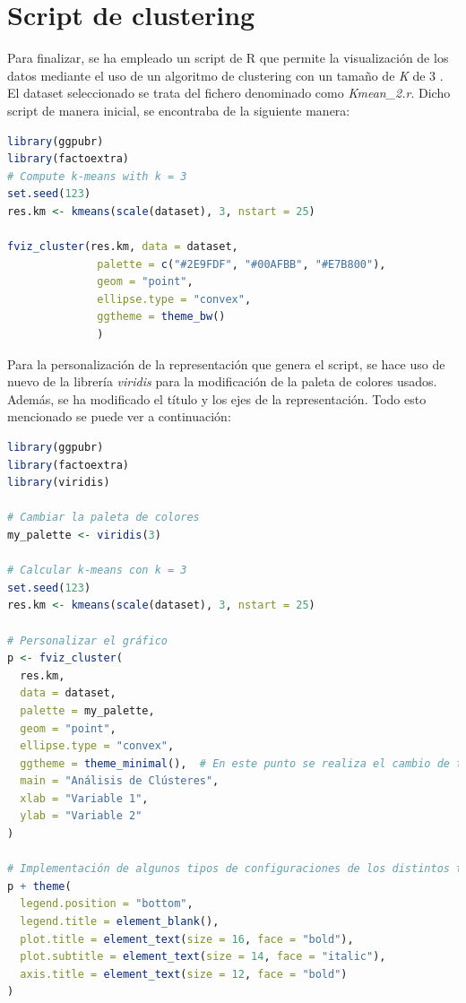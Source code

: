 \documentclass[11pt]{report}
\begin{document}
\section{Script de clustering}

Para finalizar, se ha empleado un script de R que permite la visualización de los datos mediante el uso de un algoritmo de clustering con un tamaño de \emph{K }de 3 . El dataset seleccionado se trata del fichero denominado como \emph{Kmean\_2.r}. Dicho script de manera inicial, se encontraba de la siguiente manera:

\begin{lstlisting}[language=R, breaklines=true, basicstyle=\small\ttfamily]
library(ggpubr)
library(factoextra)
# Compute k-means with k = 3
set.seed(123)
res.km <- kmeans(scale(dataset), 3, nstart = 25)

fviz_cluster(res.km, data = dataset,
              palette = c("#2E9FDF", "#00AFBB", "#E7B800"), 
              geom = "point",
              ellipse.type = "convex", 
              ggtheme = theme_bw()
              )
\end{lstlisting}

Para la personalización de la representación que genera el script, se hace uso de nuevo de la librería \emph{viridis} para la modificación de la paleta de colores usados. Además, se ha modificado el título y los ejes de la representación. Todo esto mencionado se puede ver a continuación:

\begin{lstlisting}[language=R, breaklines=true, basicstyle=\small\ttfamily]
library(ggpubr)
library(factoextra)
library(viridis)

# Cambiar la paleta de colores
my_palette <- viridis(3)

# Calcular k-means con k = 3
set.seed(123)
res.km <- kmeans(scale(dataset), 3, nstart = 25)

# Personalizar el gráfico
p <- fviz_cluster(
  res.km, 
  data = dataset,
  palette = my_palette,
  geom = "point",
  ellipse.type = "convex",
  ggtheme = theme_minimal(),  # En este punto se realiza el cambio de tema
  main = "Análisis de Clústeres",
  xlab = "Variable 1",  
  ylab = "Variable 2"   
)

# Implementación de algunos tipos de configuraciones de los distintos textos
p + theme(
  legend.position = "bottom",  
  legend.title = element_blank(), 
  plot.title = element_text(size = 16, face = "bold"),  
  plot.subtitle = element_text(size = 14, face = "italic"),  
  axis.title = element_text(size = 12, face = "bold")  
)
\end{lstlisting}
\end{document}
